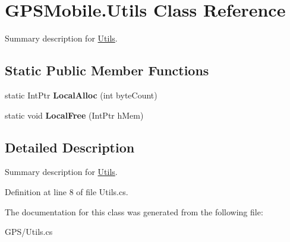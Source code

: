 \hypertarget{class_g_p_s_mobile_1_1_utils}{
\section{GPSMobile.Utils Class Reference}
\label{class_g_p_s_mobile_1_1_utils}
}


Summary description for \hyperlink{class_g_p_s_mobile_1_1_utils}{Utils}.  
\subsection*{Static Public Member Functions}
\begin{DoxyCompactItemize}
\item 
\hypertarget{class_g_p_s_mobile_1_1_utils_ad06c70e751bed4a355e24d89fb00e120}{
static IntPtr {\bfseries LocalAlloc} (int byteCount)}
\label{class_g_p_s_mobile_1_1_utils_ad06c70e751bed4a355e24d89fb00e120}

\item 
\hypertarget{class_g_p_s_mobile_1_1_utils_a8c4ab018a2f255e4671f1252726d1866}{
static void {\bfseries LocalFree} (IntPtr hMem)}
\label{class_g_p_s_mobile_1_1_utils_a8c4ab018a2f255e4671f1252726d1866}

\end{DoxyCompactItemize}


\subsection{Detailed Description}
Summary description for \hyperlink{class_g_p_s_mobile_1_1_utils}{Utils}. 

Definition at line 8 of file Utils.cs.

The documentation for this class was generated from the following file:\begin{DoxyCompactItemize}
\item 
GPS/Utils.cs\end{DoxyCompactItemize}
